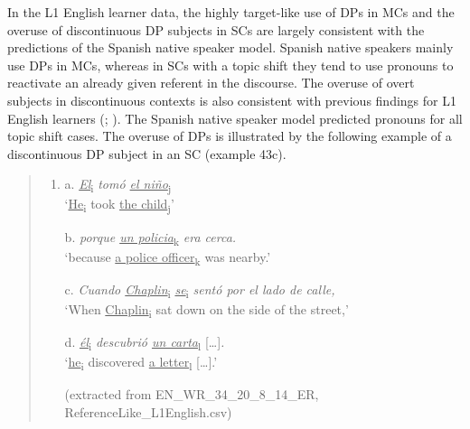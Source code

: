 \documentclass[
  letterpaper,
  DIV=11,
  numbers=noendperiod]{scrartcl}
\begin{document}
In the L1 English learner data, the highly target-like use of DPs in MCs
and the overuse of discontinuous DP subjects in SCs are largely
consistent with the predictions of the Spanish native speaker model.
Spanish native speakers mainly use DPs in MCs, whereas in SCs with a
topic shift they tend to use pronouns to reactivate an already given
referent in the discourse. The overuse of overt subjects in
discontinuous contexts is also consistent with previous findings for L1
English learners (;
). The Spanish
native speaker model predicted pronouns for all topic shift cases. The
overuse of DPs is illustrated by the following example of a
discontinuous DP subject in an SC (example 43c).

\begin{quote}
\begin{enumerate}
\def\labelenumi{\arabic{enumi}.}
\setcounter{enumi}{42}
\item
  a. \ul{\emph{El}}\textsubscript{i} \emph{tomó \ul{el
  niño}}\textsubscript{j}\\
  `\ul{He}\textsubscript{i} took \ul{the child}\textsubscript{j}'

  b. \emph{porque \ul{un policia}}\textsubscript{k} \emph{era cerca.}\\
  `because \ul{a police officer}\textsubscript{k} was nearby.'

  c. \emph{Cuando \ul{Chaplin}}\textsubscript{i}
  \ul{\emph{se}}\textsubscript{i} \emph{sentó por el lado de calle,}\\
  `When \ul{Chaplin}\textsubscript{i} sat down on the side of the
  street,'

  d. \ul{\emph{él}}\textsubscript{i} \emph{descubrió \ul{un
  carta}}\textsubscript{l} {[}\ldots{]}\emph{.}\\
  `\ul{he}\textsubscript{i} discovered \ul{a letter}\textsubscript{l}
  {[}\ldots{]}.'

  (extracted from EN\_WR\_34\_20\_8\_14\_ER,
  ReferenceLike\_L1English.csv)
\end{enumerate}
\end{quote}
\end{document}
